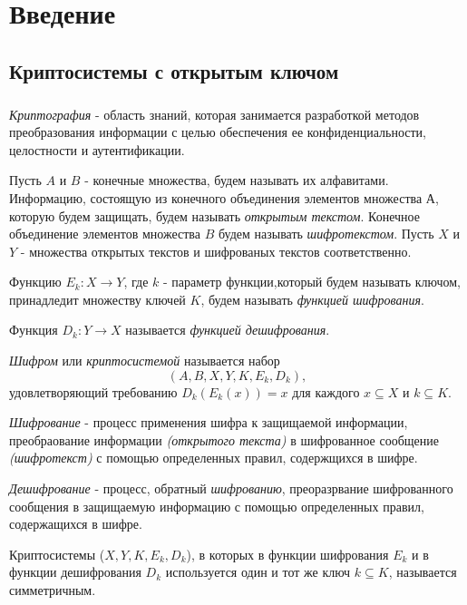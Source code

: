 \newpage
\chapter*{Введение}

\section*{Криптосистемы с открытым ключом}
\paragraph{} \textit{Криптография} - область знаний, которая занимается разработкой методов преобразования информации с целью обеспечения ее 
конфиденциальности, целостности и аутентификации.

  Пусть $A$ и $B$  - конечные множества, будем называть их алфавитами. Информацию, состоящую из конечного объединения элементов 
множества $А$, которую будем защищать, будем называть \textit{открытым текстом}. Конечное объединение элементов множества $B$ будем 
называть \textit{шифротекстом}. Пусть $X$ и $Y$ - множества открытых текстов и шифрованых текстов соответственно.

  Функцию $E_{k} : X \rightarrow Y$, где $k$ - параметр функции,который будем называть ключом, 
принадледит множеству ключей $K$, будем называть \textit{функцией шифрования}. 

  Функция $D_{k} : Y \rightarrow X$ называется \textit{функцией дешифрования}.

  \textit{Шифром} или \textit{криптосистемой} называется набор 
  \begin{equation}
    (A, B, X, Y, K, E_{k}, D_{k}),
  \end{equation}
  удовлетворяющий требованию $D_{k}(E_{k}(x)) = x$ для каждого $x \subseteq X$ и $k \subseteq K$.

  \textit{Шифрование} - процесс применения шифра к защищаемой информации, преобраование информации \textit{(открытого текста)} в шифрованное сообщение \textit{(шифротекст)} с помощью определенных правил, содержщихся в шифре.

  \textit{Дешифрование} - процесс, обратный \textit{шифрованию}, преоразрвание шифрованного сообщения в защищаемую информацию с помощью определенных 
правил, содержащихся в шифре.

  Криптосистемы ($X, Y, K, E_{k}, D_{k}$), в которых в функции шифрования $E_{k}$ и в функции 
дешифрования $D_{k}$ используется один и тот же ключ $k \subseteq K$, называется симметричным. 

